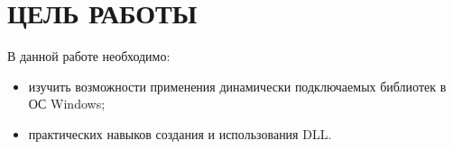 \section{ЦЕЛЬ РАБОТЫ}

В данной работе необходимо:

\begin{itemize}
  \item изучить возможности применения
    динамически подключаемых библиотек в ОС Windows;
  \item практических навыков создания и использования DLL.
\end{itemize}

\newpage